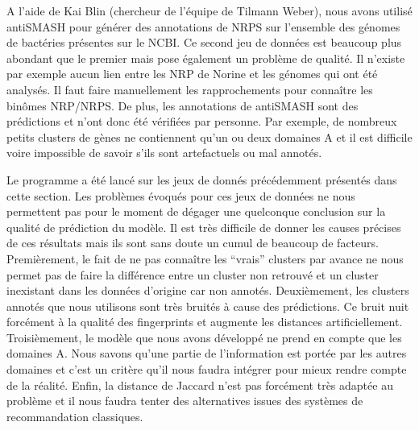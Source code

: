 
A l'aide de Kai Blin (chercheur de l'équipe de Tilmann Weber), nous avons utilisé antiSMASH pour générer des annotations de NRPS sur l'ensemble des génomes de bactéries présentes sur le NCBI.
Ce second jeu de données est beaucoup plus abondant que le premier mais pose également un problème de qualité.
Il n'existe par exemple aucun lien entre les NRP de Norine et les génomes qui ont été analysés.
Il faut faire manuellement les rapprochements pour connaître les binômes NRP/NRPS.
De plus, les annotations de antiSMASH sont des prédictions et n'ont donc été vérifiées par personne.
Par exemple, de nombreux petits clusters de gènes ne contiennent qu'un ou deux domaines A et il est difficile voire impossible de savoir s'ils sont artefactuels ou mal annotés.

Le programme a été lancé sur les jeux de donnés précédemment présentés dans cette section.
Les problèmes évoqués pour ces jeux de données ne nous permettent pas pour le moment de dégager une quelconque conclusion sur la qualité de prédiction du modèle.
Il est très difficile de donner les causes précises de ces résultats mais ils sont sans doute un cumul de beaucoup de facteurs.
Premièrement, le fait de ne pas connaître les ``vrais'' clusters par avance ne nous permet pas de faire la différence entre un cluster non retrouvé et un cluster inexistant dans les données d'origine car non annotés.
Deuxièmement, les clusters annotés que nous utilisons sont très bruités à cause des prédictions.
Ce bruit nuit forcément à la qualité des fingerprints et augmente les distances artificiellement.
Troisièmement, le modèle que nous avons développé ne prend en compte que les domaines A.
Nous savons qu'une partie de l'information est portée par les autres domaines et c'est un critère qu'il nous faudra intégrer pour mieux rendre compte de la réalité.
Enfin, la distance de Jaccard n'est pas forcément très adaptée au problème et il nous faudra tenter des alternatives issues des systèmes de recommandation classiques.


